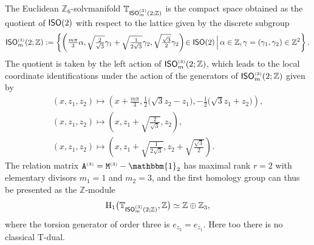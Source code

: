 \documentclass[pdftex]{sigma}
\numberwithin{equation}{section}
\newcommand{\Z}{\zed}
\newcommand{\unit}{\mathbbm{1}} 			%
\newcommand{\rmH}{{\rm H}}
\newcommand{\ISO}{{\sf ISO}}
\newcommand{\zed}{{\mathbb Z}} %
\newcommand{\torus}{{\mathbb T}} %
\begin{document}
The Euclidean
$\Z_6$-solvmanifold $\torus_{\ISO ^{\text{\tiny(3)}}_m(2;\Z)}$ is the compact
space obtained as the quotient of $\ISO(2)$ with
respect to the lattice given by the discrete subgroup
\begin{gather*} \ISO ^{\text{\tiny(3)}}_m(2;\Z) := \left\{
\left(\tfrac{m\pi}3\alpha,
\sqrt{\tfrac2{\sqrt3}} \gamma_1+\sqrt{\tfrac1{2 \sqrt3}} \gamma_2 ,
\sqrt{\tfrac{\sqrt3}2} \gamma_2\right)\!\in\ISO(2) \,
\Big| \, \alpha\in\Z,
 \gamma=(\gamma_1,\gamma_2)\in\Z^2 \right\} .
\end{gather*}
The quotient is taken by the left action of
$\ISO ^{\text{\tiny(3)}}_m(2;\Z)$, which leads
to the local coordinate identifications under the action of the
generators of $\ISO ^{\text{\tiny(3)}}_m(2;\Z)$ given by
\begin{gather*}%
(x,z_1,z_2) \longmapsto
 \left(x+\tfrac{m \pi}3 , \tfrac12 \big(\sqrt3 z_2-z_1\big) ,
 -\tfrac12 \big(\sqrt3 z_1+z_2\big)\right) , \\
(x,z_1,z_2) \longmapsto \left(x ,z_1+\sqrt{\tfrac2{\sqrt3}} , z_2\right) , \\
(x,z_1,z_2) \longmapsto \left(x , z_1+\sqrt{\tfrac1{2 \sqrt3}},
 z_2+\sqrt{\tfrac{\sqrt3}2} \right) .
\end{gather*}
The relation matrix ${\tt A}^{\text{\tiny(3)}} = {\tt M}^{\text{\tiny(3)}}-\unit_2$ has maximal rank $r=2$ with elementary divisors $m_1=1$ and
$m_2=3$, and the first homology group can thus be presented as the $\Z$-module
\[
\rmH_1\big(\torus_{\ISO ^{\text{\tiny(3)}}_m(2;\Z)},\Z\big) \simeq \Z\oplus\Z_3 ,
\]
where the torsion generator of order three is $e_{z_2}=e_{z_1}$. Here too there is no
classical T-dual.
\end{document}
